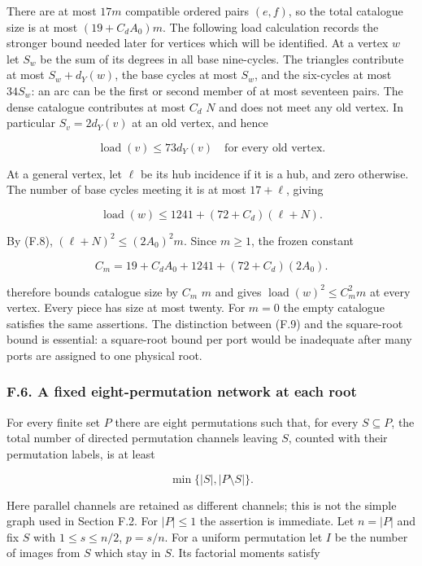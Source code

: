 \documentclass[english,11pt,a4paper]{article}
\begin{document}
There are at most \(17m\) compatible ordered pairs \((e,f)\), so the total catalogue size is at most \((19+C_d A_0)m\). The following load calculation records the stronger bound needed later for vertices which will be identified. At a vertex \(w\) let \(S_{w}\) be the sum of its degrees in all base nine-cycles. The triangles contribute at most \(S_{w}+d_{Y}(w)\), the base cycles at most \(S_{w}\), and the six-cycles at most \(34S_{w}\): an arc can be the first or second member of at most seventeen pairs. The dense catalogue contributes at most \(C_{d}\) \(N\) and does not meet any old vertex. In particular \(S_{v}=2d_{Y}(v)\) at an old vertex, and hence

\[\operatorname{load}(v)\le73d_Y(v)\quad\text{for every old vertex}.\tag{F.9}\]

At a general vertex, let \(\ell\) be its hub incidence if it is a hub, and zero otherwise. The number of base cycles meeting it is at most \(17+\ell\), giving

\[\operatorname{load}(w)\le1241+(72+C_d)(\ell+N).\]

By (F.8), \((\ell+N)^2\le(2A_0)^2m\). Since \(m\ge 1\), the frozen constant

\[C_m=19+C_dA_0+1241+(72+C_d)(2A_0).\tag{F.10}\]

therefore bounds catalogue size by \(C_{m}\) \(m\) and gives \(\operatorname{load}(w)^2\le C_m^2m\) at every vertex. Every piece has size at most twenty. For \(m=0\) the empty catalogue satisfies the same assertions. The distinction between (F.9) and the square-root bound is essential: a square-root bound per port would be inadequate after many ports are assigned to one physical root.

\subsubsection{F.6. A fixed eight-permutation network at each root}\label{f.6.-a-fixed-eight-permutation-network-at-each-root}

For every finite set \(P\) there are eight permutations such that, for every \(S\subseteq P\), the total number of directed permutation channels leaving \(S\), counted with their permutation labels, is at least

\[\min\{|S|,|P\setminus S|\}.\tag{F.11}\]

Here parallel channels are retained as different channels; this is not the simple graph used in Section F.2. For \(|P|\le 1\) the assertion is immediate. Let \(n=|P|\) and fix \(S\) with \(1\le s\le n/2\), \(p=s/n\). For a uniform permutation let \(I\) be the number of images from \(S\) which stay in \(S\). Its factorial moments satisfy
\end{document}
